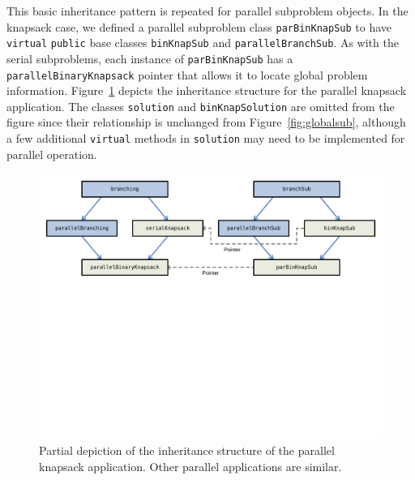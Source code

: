 This basic inheritance pattern is repeated for
parallel subproblem objects.  In the knapsack case, we defined a
parallel subproblem class \texttt{parBinKnapSub} to have
\texttt{virtual} \texttt{public} base classes \texttt{binKnapSub} and
\texttt{parallelBranchSub}.  As with the serial subproblems, each
instance of \texttt{parBinKnapSub} has a
\texttt{parallelBinaryKnapsack} pointer that allows it to locate
global problem information.  Figure~\ref{fig:parinherit} depicts the
inheritance structure for the parallel knapsack application.  The
classes \texttt{solution} and \texttt{binKnapSolution} are omitted
from the figure since their relationship is unchanged from
Figure~\ref{fig:globalsub}, although a few additional \texttt{virtual}
methods in \texttt{solution} may need
to be implemented for parallel operation.

\begin{figure}[tb]
\begin{center}
\includegraphics[width=\textwidth]{parinherit-new}
\vspace{-0.4in}
\end{center}
\caption{Partial depiction of the inheritance structure of the
  parallel knapsack application.  Other parallel applications are
  similar.}
\label{fig:parinherit}
\end{figure}

